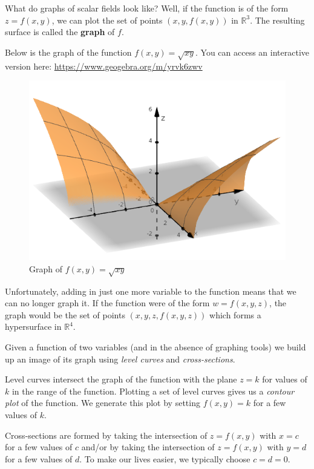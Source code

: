 \documentclass[
]{book}
\theoremstyle{definition}
\theoremstyle{definition}
\theoremstyle{definition}
\theoremstyle{definition}
\theoremstyle{remark}
\begin{document}
What do graphs of scalar fields look like? Well, if the function is of the form \(z=f(x,y)\), we can plot the set of points \((x,y, f(x,y))\) in \(\mathbb{R}^3\). The resulting surface is called the \textbf{graph} of \(f\).

Below is the graph of the function \(f(x,y)=\sqrt{xy}\). You can access an interactive version here: \url{https://www.geogebra.org/m/yrvk6zwv}

\begin{figure}

{\centering \includegraphics[width=0.5\linewidth]{images/sqrtxy} 

}

\caption{Graph of $f(x,y)=\sqrt{xy}$}\label{fig:unnamed-chunk-1}
\end{figure}

Unfortunately, adding in just one more variable to the function means that we can no longer graph it. If the function were of the form \(w=f(x,y,z)\), the graph would be the set of points \((x,y,z,f(x,y,z))\) which forms a hypersurface in \(\mathbb{R}^4\).

Given a function of two variables (and in the absence of graphing tools) we build up an image of its graph using \emph{level curves} and \emph{cross-sections}.

Level curves intersect the graph of the function with the plane \(z=k\) for values of \(k\) in the range of the function. Plotting a set of level curves gives us a \emph{contour plot} of the function. We generate this plot by setting \(f(x,y)=k\) for a few values of \(k\).

Cross-sections are formed by taking the intersection of \(z=f(x,y)\) with \(x= c\) for a few values of \(c\) and/or by taking the intersection of \(z=f(x,y)\) with \(y= d\) for a few values of \(d\). To make our lives easier, we typically choose \(c=d=0\).
\end{document}
